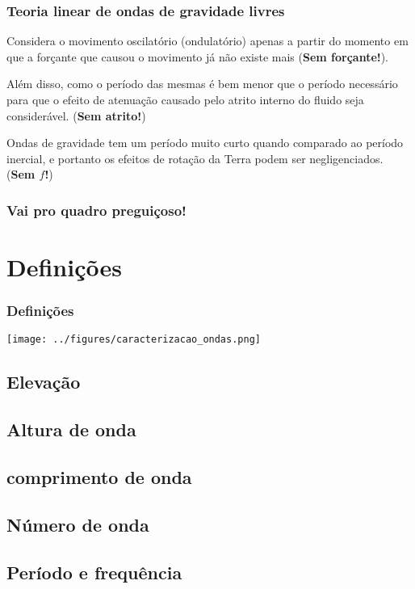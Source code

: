 \documentclass[handout,14pt,xcolor=dvipsnames]{beamer}
\begin{document}
\begin{frame}
\frametitle{ Teoria linear de ondas de gravidade livres}
\small{
    \begin{block}{}
        Considera o movimento oscilatório (ondulatório) apenas a partir do
        momento em que a forçante que causou o movimento já não existe mais
        ({\bf Sem forçante!}).
    \end{block}
    \pause
    \begin{block}{}
        Além disso, como o período das mesmas é bem menor que o período
        necessário para que o efeito de atenuação causado pelo atrito interno
        do fluido seja considerável. ({\bf Sem atrito!})
    \end{block}
    \pause
    \begin{block}{}
        Ondas de gravidade tem um período muito curto quando comparado ao
        período inercial, e portanto os efeitos de rotação da Terra podem ser
        negligenciados. ({\bf Sem $f$!})
    \end{block}
}
\end{frame}

\begin{frame}
\frametitle{Vai pro quadro preguiçoso!}
\end{frame}

\section{Definições}
\begin{frame}
    \frametitle{Definições}
    \texttt{[image: ../figures/caracterizacao\_ondas.png]}
\end{frame}

\subsection{Elevação}
\subsection{Altura de onda}
\subsection{comprimento de onda}
\subsection{Número de onda}
\subsection{Período e frequência}
\end{document}
